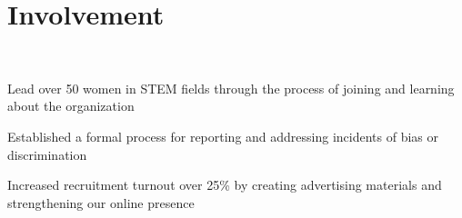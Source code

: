 \documentclass[]{hieudo-build}
\begin{document}
\begin{minipage}[t]{0.62\textwidth}


\section{Involvement}

 \\
\begin{tightemize}
\item Lead over 50 women in STEM fields through the process of joining and learning about the organization
\item Established a formal process for reporting and addressing incidents of bias or discrimination
\end{tightemize}
\begin{tightemize}
\item Increased recruitment turnout over 25\% by creating advertising materials and strengthening our online presence
\end{tightemize}
\smallsectionsep


\end{minipage}
\end{document}
